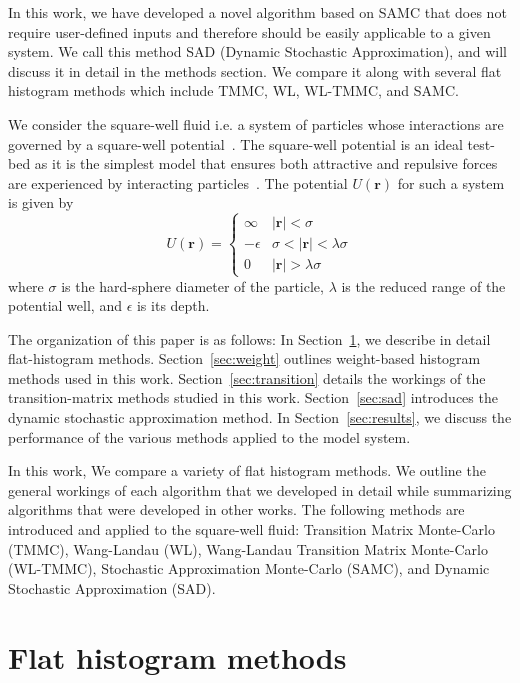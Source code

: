 \documentclass[letterpaper,twocolumn,amsmath,amssymb,pre,aps,10pt]{revtex4-1}
\begin{document}
In this work, we have developed a novel algorithm based on SAMC that
does not require user-defined inputs and therefore should be easily
applicable to a given system.  We call this method SAD (Dynamic
Stochastic Approximation), and will discuss it in detail in the methods
section. We compare it along with several flat histogram methods
which include TMMC, WL, WL-TMMC, and SAMC.

We consider the square-well fluid i.e. a system of particles whose
interactions are governed by a square-well
potential~\cite{singh2003surface, barker2004perturbationSW}.  The
square-well potential is an ideal test-bed as it is the simplest model
that ensures both attractive and repulsive forces are experienced by
interacting particles~\cite{barker1967-SW-perturbation, vega1992phase}.
The potential $U(\textbf{r})$ for such a system is given by
\begin{equation}
 U(\textbf{r})=\begin{cases} \infty &
 \lvert\textbf{r}\rvert< \sigma\\-\epsilon &
 \sigma<\lvert\textbf{r}\rvert<\lambda\sigma\\0 &
 \lvert\textbf{r}\rvert > \lambda\sigma\end{cases}
\end{equation}
where $\sigma$ is the hard-sphere diameter of the particle, $\lambda$ is the
reduced range of the potential well, and $\epsilon$ is its depth.

The organization of this paper is as follows: In Section~\ref{sec:histogram}, we
describe in detail flat-histogram methods.  Section~\ref{sec:weight} outlines
weight-based histogram methods used in this work. Section~\ref{sec:transition}
details the workings of the transition-matrix methods studied in this work.
Section~\ref{sec:sad} introduces the dynamic stochastic approximation method.
In Section~\ref{sec:results}, we discuss the performance of the various methods
applied to the model system.

In this work, We compare a variety of flat histogram
methods.  We outline the general workings of each algorithm that we
developed in detail while summarizing algorithms that were developed in other
works.  The following methods are introduced and applied to the
square-well fluid: Transition Matrix Monte-Carlo (TMMC), Wang-Landau
(WL), Wang-Landau Transition Matrix Monte-Carlo (WL-TMMC), Stochastic
Approximation Monte-Carlo (SAMC), and Dynamic Stochastic Approximation
(SAD).

\section{Flat histogram methods}\label{sec:histogram}
\end{document}
